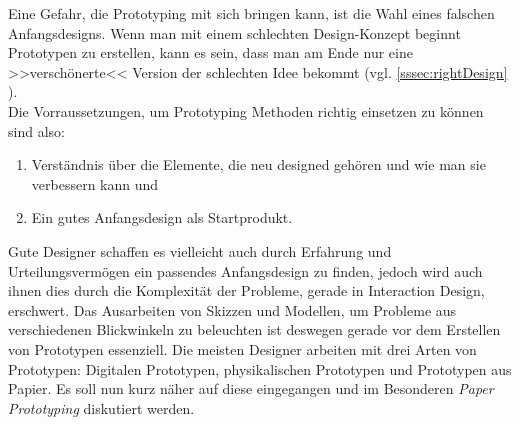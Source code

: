 Eine Gefahr, die Prototyping mit sich bringen kann, ist die Wahl eines falschen Anfangsdesigns. Wenn man mit einem schlechten Design-Konzept beginnt Prototypen zu erstellen, kann es sein, dass man am Ende nur eine >>verschönerte<< Version der schlechten Idee bekommt (vgl. \ref{sssec:rightDesign} ).\\ Die Vorraussetzungen, um Prototyping Methoden richtig einsetzen zu können sind also:

\begin{enumerate}
	\item Verständnis über die Elemente, die neu designed gehören und wie man sie verbessern kann und
	\item Ein gutes Anfangsdesign als Startprodukt.
\end{enumerate}
\begin{flushright}\citep{Dix:2004}\end{flushright}

Gute Designer schaffen es vielleicht auch durch Erfahrung und Urteilungsvermögen ein passendes Anfangsdesign zu finden, jedoch wird auch ihnen dies durch die Komplexität der Probleme, gerade in Interaction Design, erschwert. Das Ausarbeiten von Skizzen und Modellen, um Probleme aus verschiedenen Blickwinkeln zu beleuchten ist deswegen gerade vor dem Erstellen von Prototypen essenziell.
Die meisten Designer arbeiten mit drei Arten von Prototypen: Digitalen Prototypen, physikalischen Prototypen und Prototypen aus Papier. Es soll nun kurz näher auf diese eingegangen und im Besonderen \emph{Paper Prototyping} diskutiert werden. 

